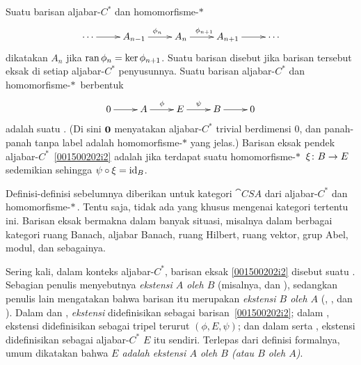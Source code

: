 \begin{defn} Suatu barisan aljabar-$C^*$ dan homomorfisme-$*\,$
   \[\xymatrix{{\cdots}\ar[r] & A_{n-1}\ar[r]^{\phi_n}
          & A_n\ar[r]^{\phi_{n+1}} & A_{n+1}\ar[r] & {\cdots}
   }\]
dikatakan
 $A_n$ jika $\operatorname{ran} \phi_n = \ker \phi_{n+1}$. Suatu barisan disebut
 jika barisan tersebut eksak di setiap aljabar-$C^*$ penyusunnya. Suatu barisan
aljabar-$C^*$ dan homomorfisme-$*\,$ berbentuk
   \begin{equation}\label{001500202i2}\xymatrix{
      0 \ar[r] & A \ar[r]^\phi & E\ar[r]^\psi & B\ar[r] & 0
   }\end{equation}
adalah suatu . (Di sini $\mathbf{0}$ menyatakan aljabar-$C^*$ trivial
berdimensi $0$, dan panah-panah tanpa label adalah homomorfisme-$*$ yang jelas.) Barisan
eksak pendek aljabar-$C^*$~\eqref{001500202i2} adalah
 jika terdapat suatu homomorfisme-$*\,$ $\xi\colon B \rightarrow E$ sedemikian
sehingga $\psi\circ\xi = \operatorname{id}_{B}$.
\end{defn}

Definisi-definisi sebelumnya diberikan untuk kategori $\cat{CSA}$ dari aljabar-$C^*$ dan
homomorfisme-$*\,$. Tentu saja, tidak ada yang khusus mengenai kategori tertentu ini.
Barisan eksak bermakna dalam banyak situasi, misalnya dalam berbagai kategori ruang Banach,
aljabar Banach, ruang Hilbert, ruang vektor, grup Abel, modul, dan sebagainya.

Sering kali, dalam konteks aljabar-$C^*$, barisan eksak \eqref{001500202i2} disebut suatu
. Sebagian penulis menyebutnya \emph{ekstensi $A$ oleh $B$} (misalnya,
\cite{Wegge-Olsen:1993} dan \cite{Davidson:1996}), sedangkan penulis lain mengatakan bahwa
barisan itu merupakan \emph{ekstensi $B$ oleh $A$} (\cite{Murphy:1990},
\cite{Fillmore:1996}, dan \cite{Blackadar:2006}). Dalam \cite{Fillmore:1996} dan
\cite{Blackadar:2006}, \emph{ekstensi} didefinisikan sebagai barisan~\eqref{001500202i2};
dalam \cite{Wegge-Olsen:1993}, ekstensi didefinisikan sebagai tripel terurut
$(\phi,E,\psi)$; dan dalam \cite{Murphy:1990} serta \cite{Davidson:1996}, ekstensi
didefinisikan sebagai aljabar-$C^*$ $E$ itu sendiri. Terlepas dari definisi formalnya,
umum dikatakan bahwa \emph{$E$ adalah ekstensi $A$ oleh $B$ (atau $B$ oleh $A$)}.

